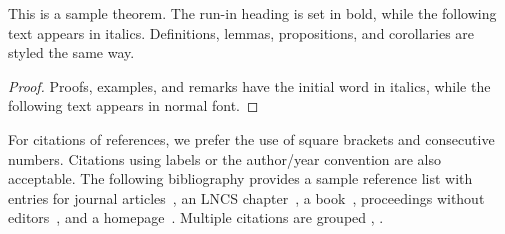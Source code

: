 \documentclass[runningheads]{llncs}
\begin{document}
\begin{theorem}
This is a sample theorem. The run-in heading is set in bold, while
the following text appears in italics. Definitions, lemmas,
propositions, and corollaries are styled the same way.
\end{theorem}
%
%
\begin{proof}
Proofs, examples, and remarks have the initial word in italics,
while the following text appears in normal font.
\end{proof}
For citations of references, we prefer the use of square brackets
and consecutive numbers. Citations using labels or the author/year
convention are also acceptable. The following bibliography provides
a sample reference list with entries for journal
articles~\cite{ref_article1}, an LNCS chapter~\cite{ref_lncs1}, a
book~\cite{ref_book1}, proceedings without editors~\cite{ref_proc1},
and a homepage~\cite{ref_url1}. Multiple citations are grouped
\cite{ref_article1,ref_lncs1,ref_book1},
\cite{ref_article1,ref_book1,ref_proc1,ref_url1}.
%
%
%
% 
% 
%
\end{document}
